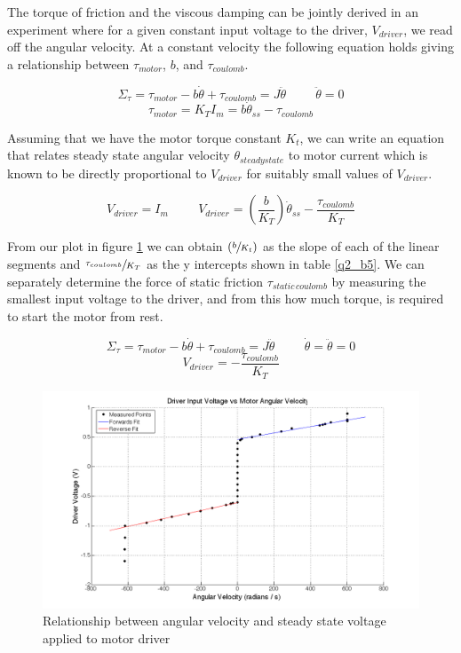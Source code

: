 \documentclass{article}
\theoremstyle{plain}
\theoremstyle{definition}
\theoremstyle{remark}
\begin{document}
The torque of friction and the viscous damping can be jointly  derived in an experiment where for a given constant input voltage to the driver, $V_{driver}$, we read off the angular velocity.  At a constant velocity the following equation holds giving a relationship between $\tau_{motor}$, $b$, and $\tau_{coulomb}$.

$$\Sigma_{\tau} =  \tau_{motor} - b\dot{\theta} + \tau_{coulomb} = J \ddot{\theta} \hspace{1cm} \ddot{\theta} = 0 $$
$$ \tau_{motor} = K_{T}I_{m} = b\dot{\theta}_{ss} - \tau_{coulomb}$$

Assuming that we have the motor torque constant $K_{t}$, we can write an equation that relates steady state angular velocity $\theta_{steady state}$ to motor current which is known to be directly proportional to $V_{driver}$ for suitably small values of $V_{driver}$.

$$ V_{driver} = I_{m} \hspace{1cm} V_{driver} = \left( \frac{b}{K_T} \right) \dot{\theta}_{ss} - \frac{\tau_{coulomb}}{K_{T}} $$

From our plot in figure \ref{q2_b4} we can obtain $\left( \sfrac{b}{K_t} \right)$ as the slope of each of the linear segments and $\sfrac{\tau_{coulomb}}{K_{T}}$ as the y intercepts shown in table \ref{q2_b5}.  We can separately determine the force of static friction $\tau_{static \, coulomb}$ by measuring the smallest input voltage to the driver, and from this how much torque, is required to start the motor from rest.

$$ \Sigma_{\tau} =  \tau_{motor} - b\dot{\theta} + \tau_{coulomb} = J \ddot{\theta} \hspace{1cm} \dot{\theta} = \ddot{\theta} = 0 $$
$$ V_{driver} = - \frac{\tau_{coulomb}}{K_{T}} $$

\begin{figure}
\begin{center}
\includegraphics[width = 16cm]{SpeedCurrentCurve.png}
\caption{Relationship between angular velocity and steady state voltage applied to motor driver}
\label{q2_b4}
\end{center}
\end{figure}
\end{document}

